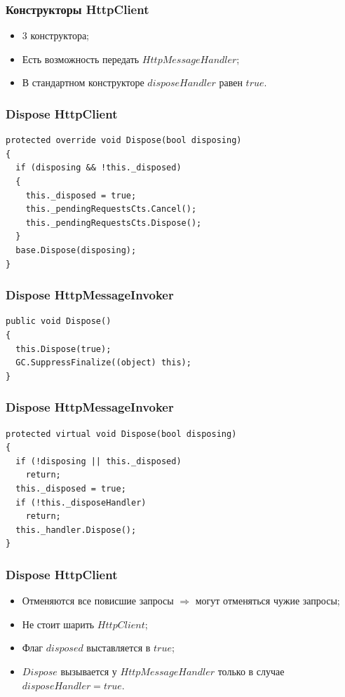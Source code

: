 \documentclass[17pt,aspectratio=169]{beamer}
\begin{document}
\begin{frame}
\frametitle{Конструкторы HttpClient}
\begin{itemize}
	\item <1-> 3 конструктора;
	\item <2-> Есть возможность передать $HttpMessageHandler$;
	\item <3-> В стандартном конструкторе $disposeHandler$ равен $true$.
\end{itemize}
\end{frame}

\begin{frame}[fragile]
\frametitle{Dispose HttpClient}
\begin{lstlisting}
protected override void Dispose(bool disposing)
{
  if (disposing && !this._disposed)
  {
    this._disposed = true;
    this._pendingRequestsCts.Cancel();
    this._pendingRequestsCts.Dispose();
  }
  base.Dispose(disposing);
}
\end{lstlisting}
\end{frame}

\begin{frame}[fragile]
\frametitle{Dispose HttpMessageInvoker}
\begin{lstlisting}
public void Dispose()
{
  this.Dispose(true);
  GC.SuppressFinalize((object) this);
}
\end{lstlisting}
\end{frame}

\begin{frame}[fragile]
\frametitle{Dispose HttpMessageInvoker}
\begin{lstlisting}
protected virtual void Dispose(bool disposing)
{
  if (!disposing || this._disposed)
    return;
  this._disposed = true;
  if (!this._disposeHandler)
    return;
  this._handler.Dispose();
}
\end{lstlisting}
\end{frame}

\begin{frame}
\frametitle{Dispose HttpClient}
\begin{itemize}
	\item <1-> Отменяются все повисшие запросы $\Rightarrow$ могут отменяться чужие запросы;
	\item <2-> Не стоит шарить $HttpClient$;
	\item <3-> Флаг $disposed$ выставляется в $true$;
	\item <4-> $Dispose$ вызывается у $HttpMessageHandler$ только в случае $disposeHandler = true$.
\end{itemize}
\end{frame}
\end{document}

